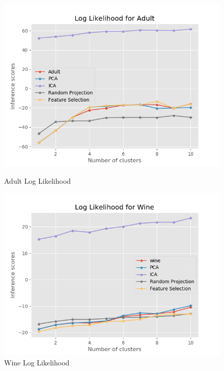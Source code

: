 \documentclass[11pt]{article}
\begin{document}
\begin{figure}[!htb]
   \begin{minipage}{0.5\textwidth}
     \centering
     \includegraphics[width=1.2\linewidth]{../figures/cluster_em_ll_adult.png}
     \caption{Adult Log Likelihood}\label{Fig:cluster_em_ll_adult}
   \end{minipage}\hfill
   \begin{minipage}{0.5\textwidth}
     \centering
     \includegraphics[width=1.2\linewidth]{../figures/cluster_em_ll_wine.png}
  \caption{Wine Log Likelihood}
  \label{Fig:cluster_em_ll_wine}
   \end{minipage}
\end{figure}
\end{document}
